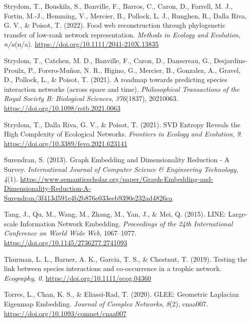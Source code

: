 \documentclass[11pt]{article}
\newlength{\cslhangindent}
\newenvironment{CSLReferences}[2] %
 {%
  \setlength{\parindent}{0pt}
  \ifodd #1 \everypar{\setlength{\hangindent}{\cslhangindent}}\ignorespaces\fi
  \ifnum #2 > 0
  \setlength{\parskip}{#2\baselineskip}
  \fi
 }%
 {}
\begin{document}
\begin{CSLReferences}{1}{0}
\leavevmode{}%
Strydom, T., Bouskila, S., Banville, F., Barros, C., Caron, D., Farrell,
M. J., Fortin, M.-J., Hemming, V., Mercier, B., Pollock, L. J., Runghen,
R., Dalla Riva, G. V., \& Poisot, T. (2022). Food web reconstruction
through phylogenetic transfer of low-rank network representation.
\emph{Methods in Ecology and Evolution}, \emph{n/a}(n/a).
\url{https://doi.org/10.1111/2041-210X.13835}

\leavevmode{}%
Strydom, T., Catchen, M. D., Banville, F., Caron, D., Dansereau, G.,
Desjardins-Proulx, P., Forero-Muñoz, N. R., Higino, G., Mercier, B.,
Gonzalez, A., Gravel, D., Pollock, L., \& Poisot, T. (2021). A roadmap
towards predicting species interaction networks (across space and time).
\emph{Philosophical Transactions of the Royal Society B: Biological
Sciences}, \emph{376}(1837), 20210063.
\url{https://doi.org/10.1098/rstb.2021.0063}

\leavevmode{}%
Strydom, T., Dalla Riva, G. V., \& Poisot, T. (2021). SVD Entropy
Reveals the High Complexity of Ecological Networks. \emph{Frontiers in
Ecology and Evolution}, \emph{9}.
\url{https://doi.org/10.3389/fevo.2021.623141}

\leavevmode{}%
Surendran, S. (2013). Graph Embedding and Dimensionality Reduction - A
Survey. \emph{International Journal of Computer Science \& Engineering
Technology}, \emph{4}(1).
\url{https://www.semanticscholar.org/paper/Graph-Embedding-and-Dimensionality-Reduction-A-Surendran/3f413d591e4b2b876e033eeb9390e232ad4826ca}

\leavevmode{}%
Tang, J., Qu, M., Wang, M., Zhang, M., Yan, J., \& Mei, Q. (2015). LINE:
Large-scale Information Network Embedding. \emph{Proceedings of the 24th
International Conference on World Wide Web}, 1067--1077.
\url{https://doi.org/10.1145/2736277.2741093}

\leavevmode{}%
Thurman, L. L., Barner, A. K., Garcia, T. S., \& Chestnut, T. (2019).
Testing the link between species interactions and co-occurrence in a
trophic network. \emph{Ecography}, \emph{0}.
\url{https://doi.org/10.1111/ecog.04360}

\leavevmode{}%
Torres, L., Chan, K. S., \& Eliassi-Rad, T. (2020). GLEE: Geometric
Laplacian Eigenmap Embedding. \emph{Journal of Complex Networks},
\emph{8}(2), cnaa007. \url{https://doi.org/10.1093/comnet/cnaa007}


\end{CSLReferences}
\end{document}
